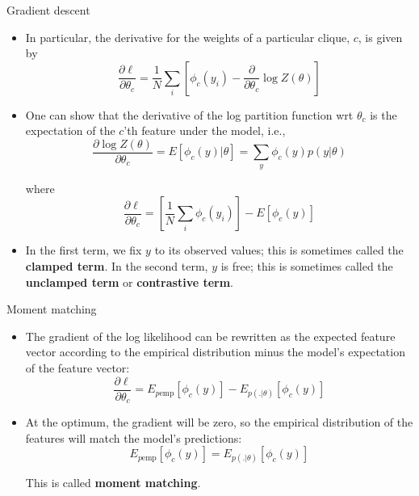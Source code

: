 \documentclass[10pt,mathserif]{beamer}
\begin{document}
\begin{frame}{Gradient descent}
\begin{itemize}
    \item In particular, the derivative for the weights of a particular clique, $c$, is given by
    \begin{equation}
        \frac{\partial\ell}{\partial\theta_c} = \frac{1}{N}\sum_i [\phi_c(y_i) - \frac{\partial}{\partial\theta_c}\log Z(\theta)]
    \end{equation}
    
    \item One can show that the derivative of the log partition function wrt $\theta_c$ is the expectation of the $c$'th feature under the model, i.e.,
    \begin{equation}
        \frac{\partial\log Z(\theta)}{\partial\theta_c} = E[\phi_c(y)|\theta] = \sum_y \phi_c (y) p(y|\theta)
    \end{equation}
    
    where 
    \begin{equation}
        \frac{\partial\ell}{\partial\theta_c} =  [\frac{1}{N}\sum_i \phi_c(y_i)] - E[\phi_c(y)]
    \end{equation}
    
    \item In the first term, we fix $y$ to its observed values; this is sometimes called the \textbf{clamped term}. In the second term, $y$ is free; this is sometimes called the \textbf{unclamped term} or \textbf{contrastive term}.
\end{itemize}
\end{frame}

\begin{frame}{Moment matching}
\begin{itemize}
    \item The gradient of the log likelihood can be rewritten as the expected feature vector according to the empirical distribution minus the model's expectation of the feature vector:
    \begin{equation}
        \frac{\partial\ell}{\partial\theta_c} = E_{p\text{emp}}[\phi_c(y)] - E_{p(.|\theta)}[\phi_c(y)]
    \end{equation}
    
    \item At the optimum, the gradient will be zero, so the empirical distribution of the features will match the model's predictions:
    \begin{equation}
        E_{p\text{emp}}[\phi_c(y)] = E_{p(.|\theta)}[\phi_c(y)]
    \end{equation}
    
    This is called \textbf{moment matching}.
\end{itemize}
\end{frame}
\end{document}
